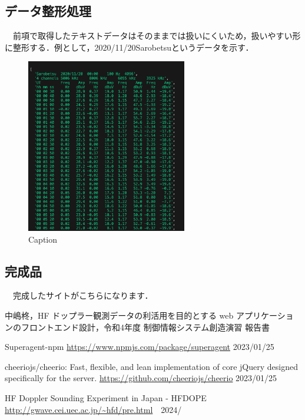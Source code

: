 \subsection{データ整形処理}
　前項で取得したテキストデータはそのままでは扱いにくいため，扱いやすい形に整形する．例として，2020/11/20Sarobetsuというデータを示す．
 \begin{figure}[h]
   \centering
   \caption{Caption}
   \label{fig:my_label}
   \includegraphics[width=70mm]{fig/textdata.png}
 \end{figure}
\subsection{完成品}
　完成したサイトがこちらになります．
\small
\begin{thebibliography}{99}
\setlength{\itemsep}{0pt}
\smallskip

中嶋柊，HF ドップラー観測データの利活用を目的とする web アプリケーションのフロントエンド設計，令和4年度 制御情報システム創造演習 報告書

Superagent-npm 
\url{https://www.npmjs.com/package/superagent}  2023/01/25

cheeriojs/cheerio: Fast, flexible, and lean implementation of core jQuery designed specifically for the server. 
\url{https://github.com/cheeriojs/cheerio}  2023/01/25 

HF Doppler Sounding Experiment in Japan - HFDOPE
\url{http://gwave.cei.uec.ac.jp/~hfd/pre.html}　2024/

\end{thebibliography}
\normalsize





